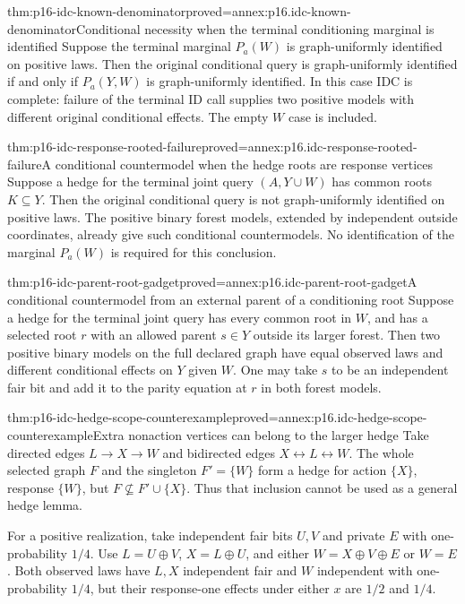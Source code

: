 \begin{hbtheorem}{thm:p16-idc-known-denominator}{proved=annex:p16.idc-known-denominator}{Conditional necessity when the terminal conditioning marginal is identified}
Suppose the terminal marginal \(P_a(W)\) is graph-uniformly
identified on positive laws. Then the original conditional query is
graph-uniformly identified if and only if \(P_a(Y,W)\) is
graph-uniformly identified. In this case IDC is complete: failure
of the terminal ID call supplies two positive models with different
original conditional effects. The empty \(W\) case is included.
\end{hbtheorem}

\begin{hbtheorem}{thm:p16-idc-response-rooted-failure}{proved=annex:p16.idc-response-rooted-failure}{A conditional countermodel when the hedge roots are response vertices}
Suppose a hedge for the terminal joint query \((A,Y\cup W)\)
has common roots \(K\subseteq Y\). Then the original conditional
query is not graph-uniformly identified on positive laws. The positive
binary forest models, extended by independent outside coordinates,
already give such conditional countermodels. No identification of
the marginal \(P_a(W)\) is required for this conclusion.
\end{hbtheorem}

\begin{hbtheorem}{thm:p16-idc-parent-root-gadget}{proved=annex:p16.idc-parent-root-gadget}{A conditional countermodel from an external parent of a conditioning root}
Suppose a hedge for the terminal joint query has every common root
in \(W\), and has a selected root \(r\) with an allowed
parent \(s\in Y\) outside its larger forest. Then two positive
binary models on the full declared graph have equal observed laws
and different conditional effects on \(Y\) given \(W\).
One may take \(s\) to be an independent fair bit and add it
to the parity equation at \(r\) in both forest models.
\end{hbtheorem}

\begin{hbtheorem}{thm:p16-idc-hedge-scope-counterexample}{proved=annex:p16.idc-hedge-scope-counterexample}{Extra nonaction vertices can belong to the larger hedge}
Take directed edges \(L\to X\to W\) and bidirected edges
\(X\leftrightarrow L\leftrightarrow W\). The whole selected
graph \(F\) and the singleton \(F'=\{W\}\) form a hedge
for action \(\{X\}\), response \(\{W\}\), but
\(F\not\subseteq F'\cup\{X\}\). Thus that inclusion
cannot be used as a general hedge lemma.

For a positive realization, take independent fair bits \(U,V\)
and private \(E\) with one-probability \(1/4\). Use
\(L=U\oplus V\), \(X=L\oplus U\), and either
\(W=X\oplus V\oplus E\) or \(W=E\).
Both observed laws have \(L,X\) independent fair and
\(W\) independent with one-probability \(1/4\), but their
response-one effects under either \(x\) are \(1/2\) and \(1/4\).
\end{hbtheorem}

